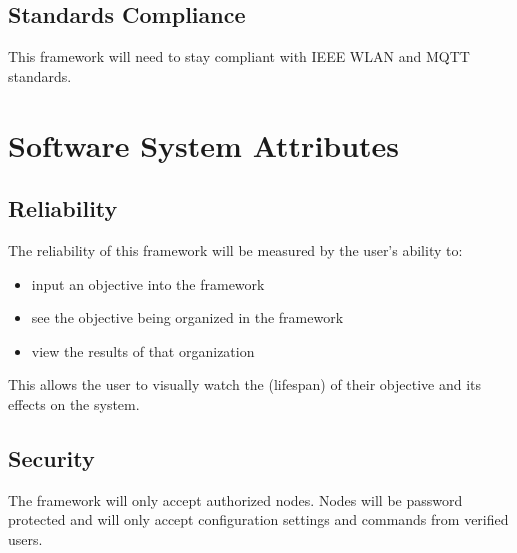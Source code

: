 \documentclass[draftclsnofoot, onecolumn, compsoc, 10pt]{IEEEtran}
\begin{document}
\subsection{Standards Compliance}
This framework will need to stay compliant with IEEE WLAN and MQTT standards.





\section{Software System Attributes}
\subsection{Reliability}


The reliability of this framework will be measured by the user's ability to:
\begin{itemize}
\item input an objective into the framework
\item see the objective being organized in the framework
\item view the results of that organization
\end{itemize} 
This allows the user to visually watch the (lifespan) of their objective and its effects on the system.


\subsection{Security}
The framework will only accept authorized nodes. Nodes will be password protected and will only accept configuration settings and commands from verified users.
\end{document}

